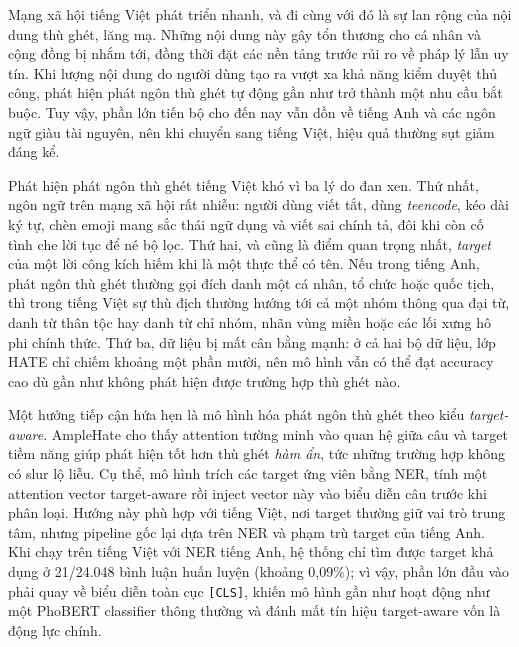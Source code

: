 \documentclass[11pt]{article}
\begin{document}
Mạng xã hội tiếng Việt phát triển nhanh, và đi cùng với đó là sự lan rộng của nội dung thù ghét, lăng mạ. Những nội dung này gây tổn thương cho cá nhân và cộng đồng bị nhắm tới, đồng thời đặt các nền tảng trước rủi ro về pháp lý lẫn uy tín. Khi lượng nội dung do người dùng tạo ra vượt xa khả năng kiểm duyệt thủ công, phát hiện phát ngôn thù ghét tự động gần như trở thành một nhu cầu bắt buộc. Tuy vậy, phần lớn tiến bộ cho đến nay vẫn dồn về tiếng Anh và các ngôn ngữ giàu tài nguyên, nên khi chuyển sang tiếng Việt, hiệu quả thường sụt giảm đáng kể.

Phát hiện phát ngôn thù ghét tiếng Việt khó vì ba lý do đan xen. Thứ nhất, ngôn ngữ trên mạng xã hội rất nhiễu: người dùng viết tắt, dùng \emph{teencode}, kéo dài ký tự, chèn emoji mang sắc thái ngữ dụng và viết sai chính tả, đôi khi còn cố tình che lời tục để né bộ lọc. Thứ hai, và cũng là điểm quan trọng nhất, \emph{target} của một lời công kích hiếm khi là một thực thể có tên. Nếu trong tiếng Anh, phát ngôn thù ghét thường gọi đích danh một cá nhân, tổ chức hoặc quốc tịch, thì trong tiếng Việt sự thù địch thường hướng tới cả một nhóm thông qua đại từ, danh từ thân tộc hay danh từ chỉ nhóm, nhãn vùng miền hoặc các lối xưng hô phi chính thức. Thứ ba, dữ liệu bị mất cân bằng mạnh: ở cả hai bộ dữ liệu, lớp HATE chỉ chiếm khoảng một phần mười, nên mô hình vẫn có thể đạt accuracy cao dù gần như không phát hiện được trường hợp thù ghét nào.

Một hướng tiếp cận hứa hẹn là mô hình hóa phát ngôn thù ghét theo kiểu \emph{target-aware}. AmpleHate \citep{amplehate} cho thấy attention tường minh vào quan hệ giữa câu và target tiềm năng giúp phát hiện tốt hơn thù ghét \emph{hàm ẩn}, tức những trường hợp không có slur lộ liễu. Cụ thể, mô hình trích các target ứng viên bằng NER, tính một attention vector target-aware rồi inject vector này vào biểu diễn câu trước khi phân loại. Hướng này phù hợp với tiếng Việt, nơi target thường giữ vai trò trung tâm, nhưng pipeline gốc lại dựa trên NER và phạm trù target của tiếng Anh. Khi chạy trên tiếng Việt với NER tiếng Anh, hệ thống chỉ tìm được target khả dụng ở 21/24{.}048 bình luận huấn luyện (khoảng 0,09\%); vì vậy, phần lớn đầu vào phải quay về biểu diễn toàn cục \texttt{[CLS]}, khiến mô hình gần như hoạt động như một PhoBERT classifier thông thường và đánh mất tín hiệu target-aware vốn là động lực chính.
\end{document}
